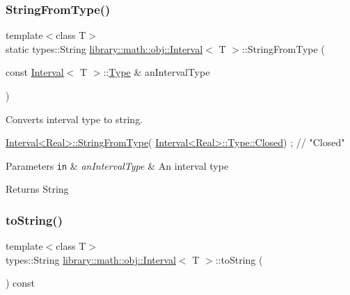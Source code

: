 \subsubsection{\texorpdfstring{String\+From\+Type()}{StringFromType()}}
{\footnotesize\ttfamily template$<$class T$>$ \\
static types\+::\+String \hyperlink{classlibrary_1_1math_1_1obj_1_1_interval}{library\+::math\+::obj\+::\+Interval}$<$ T $>$\+::String\+From\+Type (\begin{DoxyParamCaption}\item[{const \hyperlink{classlibrary_1_1math_1_1obj_1_1_interval}{Interval}$<$ T $>$\+::\hyperlink{classlibrary_1_1math_1_1obj_1_1_interval_abc7177f1c446d8273e70c989953667d1}{Type} \&}]{an\+Interval\+Type }\end{DoxyParamCaption})\hspace{0.3cm}{\ttfamily [static]}}



Converts interval type to string. 


\begin{DoxyCode}
\hyperlink{classlibrary_1_1math_1_1obj_1_1_interval_a64a1850152db9b95c9824c71378d9f40}{Interval<Real>::StringFromType}(
      \hyperlink{classlibrary_1_1math_1_1obj_1_1_interval_abc7177f1c446d8273e70c989953667d1a03f4a47830f97377a35321051685071e}{Interval<Real>::Type::Closed}) ; \textcolor{comment}{// "Closed"}
\end{DoxyCode}



\begin{DoxyParams}[1]{Parameters}
\mbox{\tt in}  & {\em an\+Interval\+Type} & An interval type \\
\hline
\end{DoxyParams}
\begin{DoxyReturn}{Returns}
String 
\end{DoxyReturn}
\mbox{\label{classlibrary_1_1math_1_1obj_1_1_interval_ad75c400daf533c35bc91da8c50b00a9e}} 
\subsubsection{\texorpdfstring{to\+String()}{toString()}}
{\footnotesize\ttfamily template$<$class T$>$ \\
types\+::\+String \hyperlink{classlibrary_1_1math_1_1obj_1_1_interval}{library\+::math\+::obj\+::\+Interval}$<$ T $>$\+::to\+String (\begin{DoxyParamCaption}{ }\end{DoxyParamCaption}) const}




